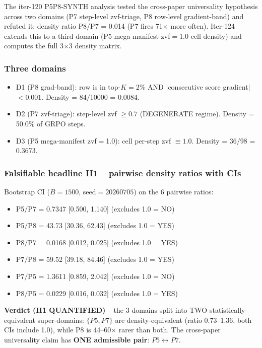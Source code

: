 \documentclass{article}
\begin{document}
The iter-120 P5P8-SYNTH analysis tested the cross-paper universality
hypothesis across two domains (P7 step-level zvf-triage, P8 row-level
gradient-band) and refuted it: density ratio P8$/$P7 = 0.014 (P7 fires
71$\times$ more often).  Iter-124 extends this to a third domain (P5
mega-manifest zvf$=$1.0 cell density) and computes the full
3$\times$3 density matrix.

\subsubsection{Three domains}
\begin{itemize}
\item D1 (P8 grad-band): row is in top-$K{=}2$\% AND $|$consecutive score gradient$|$ $< 0.001$.  Density = 84$/$10000 = 0.0084.
\item D2 (P7 zvf-triage): step-level zvf $\geq 0.7$ (DEGENERATE regime).  Density = 50.0\% of GRPO steps.
\item D3 (P5 mega-manifest zvf$=$1.0): cell per-step zvf $\equiv 1.0$.  Density = 36$/$98 = 0.3673.
\end{itemize}

\subsubsection{Falsifiable headline H1 -- pairwise density ratios with CIs}
Bootstrap CI ($B{=}1500$, seed$=20260705$) on the 6 pairwise ratios:
\begin{itemize}
\item P5$/$P7 = 0.7347 [0.500, 1.140] \quad (excludes 1.0 = NO)
\item P5$/$P8 = 43.73 [30.36, 62.43] \quad (excludes 1.0 = YES)
\item P8$/$P7 = 0.0168 [0.012, 0.025] \quad (excludes 1.0 = YES)
\item P7$/$P8 = 59.52 [39.18, 84.46] \quad (excludes 1.0 = YES)
\item P7$/$P5 = 1.3611 [0.859, 2.042] \quad (excludes 1.0 = NO)
\item P8$/$P5 = 0.0229 [0.016, 0.032] \quad (excludes 1.0 = YES)
\end{itemize}
\textbf{Verdict (H1 QUANTIFIED)} -- the 3 domains split into TWO
statistically-equivalent super-domains: $\{P5, P7\}$ are density-equivalent
(ratio 0.73--1.36, both CIs include 1.0), while P8 is 44--60$\times$
rarer than both.  The cross-paper universality claim has
\textbf{ONE admissible pair}: $P5 \leftrightarrow P7$.
\end{document}
